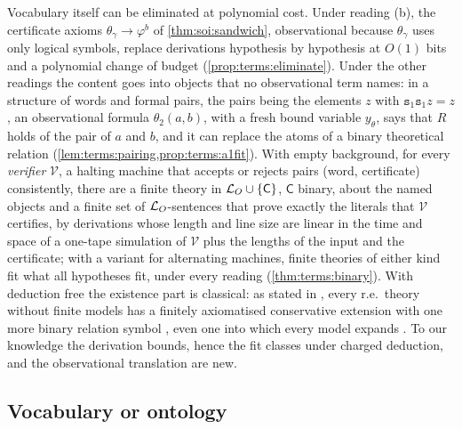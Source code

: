 Vocabulary itself can be eliminated at polynomial cost. Under reading (b), the certificate axioms $\theta_\gamma\to\varphi^b$ of \cref{thm:soi:sandwich}, observational because $\theta_\gamma$ uses only logical symbols, replace derivations hypothesis by hypothesis at $O(1)$ bits and a polynomial change of budget (\cref{prop:terms:eliminate}). Under the other readings the content goes into objects that no observational term names: in a structure of words and formal pairs, the pairs being the elements $z$ with $\mathtt s_1\mathtt s_1z=z$, an observational formula $\theta_2(a,b)$, with a fresh bound variable $y_\theta$, says that $R$ holds of the pair of $a$ and $b$, and it can replace the atoms of a binary theoretical relation (\cref{lem:terms:pairing,prop:terms:a1fit}). With empty background, for every \emph{verifier} $\mathcal V$, a halting machine that accepts or rejects pairs (word, certificate) consistently, there are a finite theory in $\mathcal{L}_{O}\cup\{\mathsf C\}$, $\mathsf C$ binary, about the named objects and a finite set of $\mathcal{L}_{O}$-sentences that prove exactly the literals that $\mathcal V$ certifies, by derivations whose length and line size are linear in the time and space of a one-tape simulation of $\mathcal V$ plus the lengths of the input and the certificate; with a variant for alternating machines, finite theories of either kind fit what all hypotheses fit, under every reading (\cref{thm:terms:binary}). With deduction free the existence part is classical: as stated in \citet{pakhomov2019question}, every r.e.\ theory without finite models has a finitely axiomatised conservative extension with one more binary relation symbol \citep{kleene1952finite}, even one into which every model expands \citep{craigvaught1958finite}. To our knowledge the derivation bounds, hence the fit classes under charged deduction, and the observational translation are new.

\subsection{Vocabulary or ontology}\label{sec:terms:ontology}

